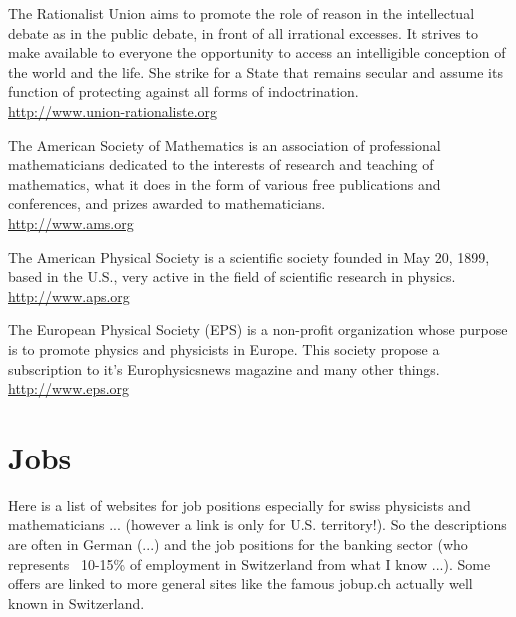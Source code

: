 		{\Large {}}{\Large {}}{\Large {}}\bcdfrance{} The Rationalist Union aims to promote the role of reason in the intellectual debate as in the public debate, in front of all irrational excesses. It strives to make available to everyone the opportunity to access an intelligible conception of the world and the life. She strike for a State that remains secular and assume its function of protecting against all forms of indoctrination.\\
		\href{http://www.union-rationaliste.org}{\color{blue}http://www.union-rationaliste.org}
		
		{\Large {}}{\Large {}} The American Society of Mathematics is an association of professional mathematicians dedicated to the interests of research and teaching of mathematics, what it does in the form of various free publications and conferences, and prizes awarded to mathematicians.\\
		\href{http://www.ams.org}{\color{blue}http://www.ams.org}
		
		{\Large {}}{\Large {}} The American Physical Society is a scientific society founded in May 20, 1899, based in the U.S., very active in the field of scientific research in physics.\\
		\href{http://www.aps.org}{\color{blue}http://www.aps.org}
		
		{\Large {}}{\Large {}}{\Large {}} The European Physical Society (EPS) is a non-profit organization whose purpose is to promote physics and physicists in Europe. This society propose a subscription to it's Europhysicsnews magazine and many other things.\\
		\href{http://www.eps.org}{\color{blue}http://www.eps.org}

	\pagebreak
	\section{Jobs}
	
	{\Large {}} Here is a list of websites for job positions especially for swiss physicists and mathematicians ... (however a link is only for U.S. territory!). So the descriptions are often in German (...) and the job positions for the banking sector (who represents ~10-15\% of employment in Switzerland from what I know ...). Some offers are linked to more general sites like the famous jobup.ch actually well known in Switzerland.
	
